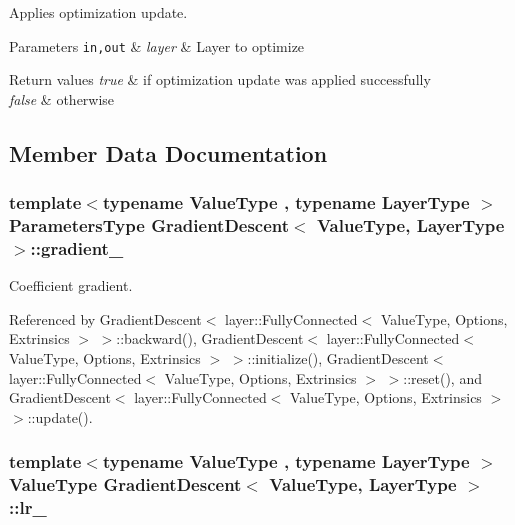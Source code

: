 Applies optimization update. 


\begin{DoxyParams}[1]{Parameters}
\mbox{\tt in,out}  & {\em layer} & Layer to optimize \\
\hline
\end{DoxyParams}

\begin{DoxyRetVals}{Return values}
{\em true} & if optimization update was applied successfully \\
\hline
{\em false} & otherwise \\
\hline
\end{DoxyRetVals}


\subsection{Member Data Documentation}
\hypertarget{class_gradient_descent_a552169cc01e9c6222da57190797aa32f}{
\subsubsection[{gradient\-\_\-}]{\setlength{\rightskip}{0pt plus 5cm}template$<$typename Value\-Type , typename Layer\-Type $>$ {\bf Parameters\-Type} {\bf Gradient\-Descent}$<$ Value\-Type, Layer\-Type $>$\-::gradient\-\_\-\hspace{0.3cm}{\ttfamily [protected]}}}\label{class_gradient_descent_a552169cc01e9c6222da57190797aa32f}


Coefficient gradient. 



Referenced by Gradient\-Descent$<$ layer\-::\-Fully\-Connected$<$ Value\-Type, Options, Extrinsics $>$ $>$\-::backward(), Gradient\-Descent$<$ layer\-::\-Fully\-Connected$<$ Value\-Type, Options, Extrinsics $>$ $>$\-::initialize(), Gradient\-Descent$<$ layer\-::\-Fully\-Connected$<$ Value\-Type, Options, Extrinsics $>$ $>$\-::reset(), and Gradient\-Descent$<$ layer\-::\-Fully\-Connected$<$ Value\-Type, Options, Extrinsics $>$ $>$\-::update().

\hypertarget{class_gradient_descent_ad30dfe9d565d302f7fedde8f8091ac75}{
\subsubsection[{lr\-\_\-}]{\setlength{\rightskip}{0pt plus 5cm}template$<$typename Value\-Type , typename Layer\-Type $>$ Value\-Type {\bf Gradient\-Descent}$<$ Value\-Type, Layer\-Type $>$\-::lr\-\_\-\hspace{0.3cm}{\ttfamily [protected]}}}\label{class_gradient_descent_ad30dfe9d565d302f7fedde8f8091ac75}


